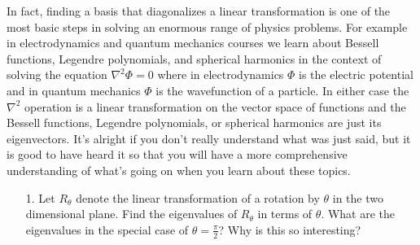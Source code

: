 In fact, finding a basis that diagonalizes a linear transformation is one of the most basic steps in solving an enormous range of physics problems.
For example in electrodynamics and quantum mechanics courses we learn about Bessell functions, Legendre polynomials, and spherical harmonics in the context of solving the equation $\nabla ^2 \Phi = 0$ where in electrodynamics $\Phi$ is the electric potential and in quantum mechanics $\Phi$ is the wavefunction of a particle.
In either case the $\nabla ^2$ operation is a linear transformation on the vector space of functions and the Bessell functions, Legendre polynomials, or spherical harmonics are just its eigenvectors.
It's alright if you don't really understand what was just said, but it is good to have heard it so that you will have a more comprehensive understanding of what's going on when you learn about these topics.

\begin{itemize}
  \item[1.] Let $R_{\theta}$ denote the linear transformation of a rotation by $\theta$ in the two dimensional plane. Find the eigenvalues of $R_{\theta}$ in terms of $\theta$.  What are the eigenvalues in the special case of $\theta = \frac{\pi}{2}$?   Why is this so interesting?
\end{itemize}


